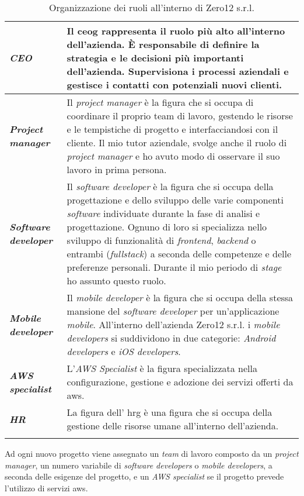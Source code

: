 \begin{longtable}{|>{\RaggedRight\arraybackslash}p{3.5cm}|>{\RaggedRight\arraybackslash}p{8.5cm}|}
    \rowcolor{tableoddrow}\textbf{\textit{CEO}} & Il \gls{ceog} rappresenta il ruolo più alto all'interno dell'azienda. È responsabile di definire la strategia e le decisioni più importanti dell'azienda. Supervisiona i processi aziendali e gestisce i contatti con potenziali nuovi clienti. \\
    \hline
    \rowcolor{tableevenrow}\textbf{\textit{Project manager}} & Il \textit{project manager} è la figura che si occupa di coordinare il proprio team di lavoro, gestendo le risorse e le tempistiche di progetto e interfacciandosi con il cliente. Il mio tutor aziendale, svolge anche il ruolo di \textit{project manager} e ho avuto modo di osservare il suo lavoro in prima persona.\\
    \hline
    \rowcolor{tableoddrow}\textbf{\textit{Software developer}} & Il \textit{software developer} è la figura che si occupa della progettazione e dello sviluppo delle varie componenti \textit{software} individuate durante la fase di analisi e progettazione. Ognuno di loro si specializza nello sviluppo di funzionalità di \textit{frontend}, \textit{backend} o entrambi (\textit{fullstack}) a seconda delle competenze e delle preferenze personali.
    Durante il mio periodo di \textit{stage} ho assunto questo ruolo.\\
    \hline
    \rowcolor{tableevenrow}\textbf{\textit{Mobile developer}} & Il \textit{mobile developer} è la figura che si occupa della stessa mansione del \textit{software developer} per un'applicazione \textit{mobile}. All'interno dell'azienda Zero12 s.r.l. i \textit{mobile developers} si suddividono in due categorie: \textit{Android developers} e \textit{iOS developers}.\\
    \hline
    \rowcolor{tableoddrow}\textbf{\textit{AWS specialist}} & L'\textit{AWS Specialist} è la figura specializzata nella configurazione, gestione e adozione dei servizi offerti da \gls{aws}.\\
    \hline
    \rowcolor{tableevenrow}\textbf{\textit{HR}} & La figura dell' \gls{hrg} è una figura che si occupa della gestione delle risorse umane all'interno dell'azienda.\\
    \hline
    \caption{Organizzazione dei ruoli all'interno di Zero12 s.r.l.}
    \label{tab:ruoli}
\end{longtable}
Ad ogni nuovo progetto viene assegnato un \textit{team} di lavoro composto da un \textit{project manager}, un numero variabile di \textit{software developers} o \textit{mobile developers}, a seconda delle esigenze del progetto, e un \textit{AWS specialist} se il progetto prevede l'utilizzo di servizi \gls{aws}. 
\pagebreak

